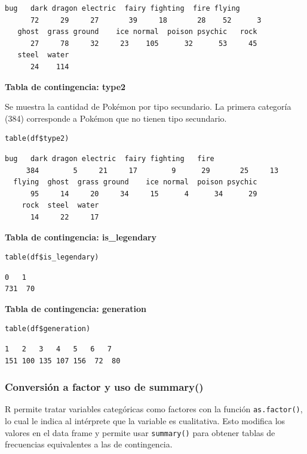 \documentclass[11pt,a4paper]{article}
\begin{document}
\begin{lstlisting}[style=Routput]
     bug   dark dragon electric  fairy fighting  fire flying
      72     29     27       39     18       28    52      3
   ghost  grass ground    ice normal  poison psychic   rock
      27     78     32     23    105      32      53     45
   steel  water
      24    114
\end{lstlisting}

\textbf{Tabla de contingencia: type2}

Se muestra la cantidad de Pokémon por tipo secundario. La primera categoría (384) corresponde a
Pokémon que no tienen tipo secundario.

\begin{lstlisting}[style=Rstyle]
table(df$type2)
\end{lstlisting}

\begin{lstlisting}[style=Routput]
              bug   dark dragon electric  fairy fighting   fire
     384        5     21     17        9      29       25     13
  flying  ghost  grass ground    ice normal  poison psychic
      95     14     20     34     15      4      34      29
    rock  steel  water
      14     22     17
\end{lstlisting}

\textbf{Tabla de contingencia: is\_legendary}

\begin{lstlisting}[style=Rstyle]
table(df$is_legendary)
\end{lstlisting}

\begin{lstlisting}[style=Routput]
  0   1
731  70
\end{lstlisting}

\textbf{Tabla de contingencia: generation}

\begin{lstlisting}[style=Rstyle]
table(df$generation)
\end{lstlisting}

\begin{lstlisting}[style=Routput]
  1   2   3   4   5   6   7
151 100 135 107 156  72  80
\end{lstlisting}

\subsubsection{Conversión a factor y uso de summary()}

R permite tratar variables categóricas como factores con la función \texttt{as.factor()}, lo cual
le indica al intérprete que la variable es cualitativa. Esto modifica los valores en el data frame y
permite usar \texttt{summary()} para obtener tablas de frecuencias equivalentes a las de contingencia.
\end{document}
